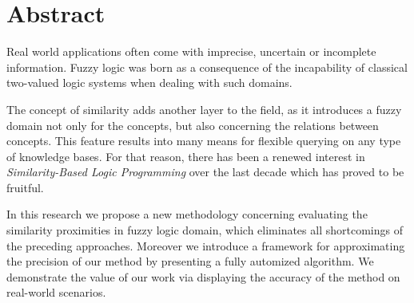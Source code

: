 \documentclass[egilmezThesis.tex]{subfiles}
\begin{document}
\chapter*{\centering \LARGE{Abstract}}
\label{chap:Abstract}

\small{Real world applications often come with imprecise, uncertain or incomplete information. Fuzzy logic was born as a consequence of  the incapability of classical two-valued logic systems when dealing with such domains.}

\small{The concept of similarity adds another layer to the field, as it introduces a fuzzy domain not only for the concepts, but also concerning the relations between concepts. This feature results into many means for flexible querying on any type of knowledge bases. For that reason, there has been a renewed interest in \textit{Similarity-Based Logic Programming} over the last decade which has proved to be fruitful.}

\small{In this research we propose a new methodology concerning evaluating the similarity proximities in fuzzy logic domain, which eliminates all shortcomings of the preceding approaches. Moreover we introduce a framework for approximating the precision of our method by presenting a fully automized algorithm.  We demonstrate the value of our work via displaying the accuracy of the method on real-world scenarios.}
\end{document}
